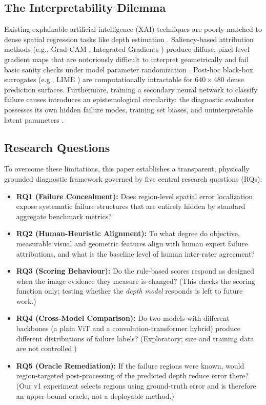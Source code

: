 \documentclass[11pt,a4paper]{article}
\begin{document}
\subsection{The Interpretability Dilemma}
Existing explainable artificial intelligence (XAI) techniques are poorly matched to dense spatial regression tasks like depth estimation \citep{cheng2025comprehensive}. Saliency-based attribution methods (e.g., Grad-CAM \citep{selvaraju2020grad}, Integrated Gradients \citep{sundararajan2017axiomatic}) produce diffuse, pixel-level gradient maps that are notoriously difficult to interpret geometrically and fail basic sanity checks under model parameter randomization \citep{adebayo2018sanity}. Post-hoc black-box surrogates (e.g., LIME \citep{ribeiro2016why}) are computationally intractable for $640 \times 480$ dense prediction surfaces. Furthermore, training a secondary neural network to classify failure causes introduces an epistemological circularity: the diagnostic evaluator possesses its own hidden failure modes, training set biases, and uninterpretable latent parameters \citep{gilpin2018explaining}.

\subsection{Research Questions}
To overcome these limitations, this paper establishes a transparent, physically grounded diagnostic framework governed by five central research questions (RQs):
\begin{itemize}
    \item \textbf{RQ1 (Failure Concealment):} Does region-level spatial error localization expose systematic failure structures that are entirely hidden by standard aggregate benchmark metrics?
    \item \textbf{RQ2 (Human-Heuristic Alignment):} To what degree do objective, measurable visual and geometric features align with human expert failure attributions, and what is the baseline level of human inter-rater agreement?
    \item \textbf{RQ3 (Scoring Behaviour):} Do the rule-based scores respond as designed when the image evidence they measure is changed? (This checks the scoring function only; testing whether the \emph{depth model} responds is left to future work.)
    \item \textbf{RQ4 (Cross-Model Comparison):} Do two models with different backbones (a plain ViT and a convolution-transformer hybrid) produce different distributions of failure labels? (Exploratory; size and training data are not controlled.)
    \item \textbf{RQ5 (Oracle Remediation):} If the failure regions were known, would region-targeted post-processing of the predicted depth reduce error there? (Our v1 experiment selects regions using ground-truth error and is therefore an upper-bound oracle, not a deployable method.)
\end{itemize}
\end{document}
